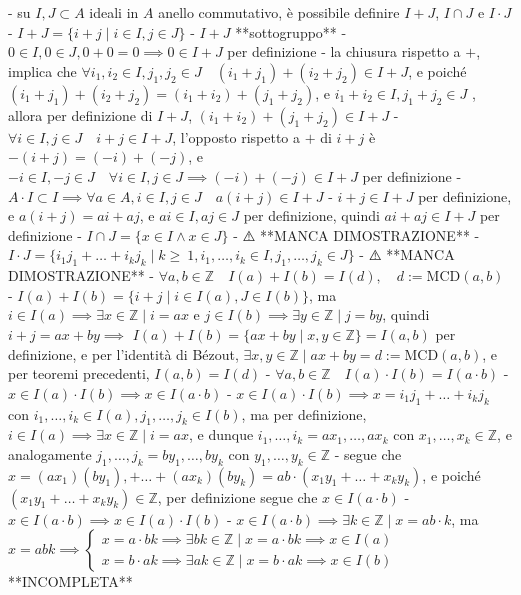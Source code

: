 - su $I, J \subset A$ ideali in $A$ anello commutativo, è possibile definire $I + J$, $I \cap J$ e $I \cdot J$
  - $I + J = \{i + j \mid i \in I, j \in J\}$
    - $I + J$ **sottogruppo**
      - \( 0 \in I, 0 \in J, 0+0=0 \implies 0 \in I + J \) per definizione
      - la chiusura rispetto a $+$, implica che $\forall i_1, i_2 \in I, j_1, j_2 \in J \quad (i_1 + j_1) + (i_2 + j_2) \in I + J$, e poiché $(i_1 + j_1) + (i_2 + j_2) = (i_1 + i_2) + (j_1 + j_2)$, e $i_1 + i_2 \in I, j_1 + j_2 \in J$ , allora per definizione di $I + J$, $(i_1 + i_2) + (j_1 + j_2) \in I + J$
      - $\forall i \in I, j \in J \quad i + j \in I + J$, l'opposto rispetto a $+$ di $i + j$ è $- (i + j) = (-i) + (-j)$, e $-i \in I, -j \in J \quad \forall i \in I, j \in J \implies (-i) + (-j) \in I + J$ per definizione
    - $A \cdot I \subset I \implies \forall a \in A, i \in I, j \in J \quad a(i + j) \in I + J$
      - $i + j \in I + J$ per definizione, e $a(i + j) = ai + aj$, e $ai \in I, aj \in J$ per definizione, quindi $ai + aj \in I + J$ per definizione
  - $I \cap J = \{x \in I \land x \in J\}$
    - ⚠️ **MANCA DIMOSTRAZIONE**
  - $I \cdot J = \{i_1 j_1 + \ldots + i_k j_k \mid k \ge \ 1, i_1 , \ldots , i_k \in I, j_1 , \ldots , j_k \in J \}$
    - ⚠️ **MANCA DIMOSTRAZIONE**
- $\forall a, b \in \mathbb{Z} \quad I(a) + I(b) = I(d), \quad d:= \textrm{MCD}(a, b)$
  - \( I(a)+I(b)=\{i+j \mid i \in I(a), J \in I(b) \} \), ma $i \in I(a) \implies \exists x \in \mathbb{Z} \mid i = ax$ e $j \in I(b) \implies \exists y \in \mathbb{Z} \mid j = by$, quindi $i + j = ax + by \implies$ \( I(a)+I(b)=\{a x+b y \mid x, y \in \mathbb{Z}\} = I(a, b) \) per definizione, e per l'identità di Bézout, $\exists x, y \in \mathbb{Z} \mid ax + by = d := \textrm{MCD}(a, b)$, e per teoremi precedenti, $I(a, b) = I(d)$
- \( \forall a, b \in \mathbb{Z} \quad I(a) \cdot I(b)=I(a \cdot b) \)
  - \( x \in I(a) \cdot I(b) \implies x \in I(a \cdot b) \)
    - $x \in I(a) \cdot I(b) \implies x = i_1 j_1 + \ldots + i_k j_k$ con $i_1 , \ldots , i_k \in I(a), j_1 , \ldots , j_k \in I(b)$, ma per definizione, $i \in I(a) \implies \exists x \in \mathbb{Z} \mid i = ax$, e dunque $i_1, \ldots, i_k = ax_1, \ldots, ax_k$ con $x_1, \ldots, x_k \in \mathbb{Z}$, e analogamente $j_1, \ldots, j_k = by_1, \ldots, by_k$ con $y_1, \ldots, y_k \in \mathbb{Z}$
    - segue che $x = (ax_1)(by_1),+\ldots+ (ax_k)(by_k) = ab\cdot(x_1y_1+ \ldots+ x_ky_k)$, e poiché $(x_1y_1+ \ldots+ x_ky_k) \in \mathbb{Z}$, per definizione segue che $x \in I(a\cdot b)$
  - \( x \in I(a \cdot b)  \implies x \in I(a) \cdot I(b)\)
    - $x \in I(a \cdot b) \implies \exists k \in \mathbb{Z} \mid x = ab \cdot k$, ma \( x=a b k \implies\left\{\begin{array}{l}x=a \cdot b k \implies \exists bk \in \mathbb{Z} \mid x = a \cdot bk \implies x \in I(a) \\ x=b \cdot a k \implies \exists ak \in \mathbb{Z} \mid x = b \cdot ak \implies x \in I(b)\end{array}\right. \) **INCOMPLETA**





